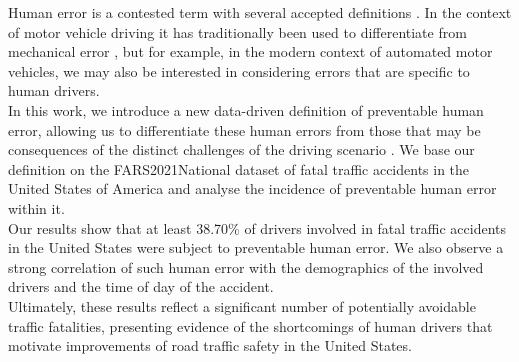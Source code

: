 \documentclass{article}
\theoremstyle{plain}
\theoremstyle{definition}
\theoremstyle{remark}
\begin{document}
Human error is a contested term with several accepted definitions \citep{reason2000human, woods2017behind, strauch2017investigating}. In the context of motor vehicle driving it has traditionally been used to differentiate from mechanical error \citep{stanton2009human}, but for example, in the modern context of automated motor vehicles, we may also be interested in considering errors that are specific to human drivers.
\\
In this work, we introduce a new data-driven definition of preventable human error, allowing us to differentiate these human errors from those that may be consequences of the distinct challenges of the driving scenario \citep{guanetti2018control}. We base our definition on the FARS2021National dataset \citep{fars} of fatal traffic accidents in the United States of America and analyse the incidence of preventable human error within it. 
\\
Our results show that at least 38.70\% of drivers involved in fatal traffic accidents in the United States were subject to preventable human error. We also observe a strong correlation of such human error with the demographics of the involved drivers and the time of day of the accident.
\\
Ultimately, these results reflect a significant number of potentially avoidable traffic fatalities, presenting evidence of the shortcomings of human drivers that motivate improvements of road traffic safety in the United States.


\end{document}
